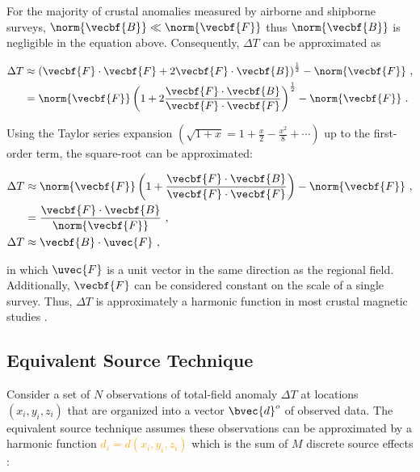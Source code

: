 \noindent
For the majority of crustal anomalies measured by airborne and shipborne surveys, $\norm{\vecbf{B}} \ll \norm{\vecbf{F}}$ thus $\norm{\vecbf{B}}$ is negligible in the equation above. Consequently, $\Delta T$ can be approximated as \citep{Blakley1995}

\begin{align}
    \Delta T &\approx \left(
        \vecbf{F} \cdot \vecbf{F} 
        + 2\vecbf{F} \cdot \vecbf{B}
    \right)^{\frac{1}{2}} 
    - \norm{\vecbf{F}} \ ,
    \\
    &= \norm{\vecbf{F}} \left(
        1 + 2 \dfrac{
            \vecbf{F} \cdot \vecbf{B}
        }{
            \vecbf{F} \cdot \vecbf{F}
        }
    \right)^{\frac{1}{2}} 
    - \norm{\vecbf{F}} \ .
    \label{eq:}
\end{align}

\noindent
Using the Taylor series expansion $\left( \sqrt{1 + x} = 1 + \frac{x}{2} - \frac{x^2}{8} + \cdots \right)$ up to the first-order term, the square-root can be approximated:

\begin{align}
    \Delta T & \approx \norm{\vecbf{F}} \left(
        1 + \dfrac{
            \vecbf{F} \cdot \vecbf{B}
        }{
            \vecbf{F} \cdot \vecbf{F}
        }
    \right) 
    - \norm{\vecbf{F}} \ ,
    \\
    &=
    \dfrac{\vecbf{F} \cdot \vecbf{B}}{\norm{\vecbf{F}}} \ ,
    \\
\label{eq:tfa_dot_product}
    \Delta T & \approx \vecbf{B} \cdot \uvec{F}
    \ ,
\end{align}

\noindent
in which $\uvec{F}$ is a unit vector in the same direction as the regional field. Additionally, $\vecbf{F}$ can be considered constant on the scale of a single survey. Thus, $\Delta T$ is approximately a harmonic function in most crustal magnetic studies \citep{Blakley1995,OliveiraJr2015}.


\subsection{Equivalent Source Technique}

Consider a set of $N$ observations of total-field anomaly $\Delta T$ at locations $(x_i, y_i, z_i)$ that are organized into a vector $\bvec{d}^o$ of observed data. The equivalent source technique assumes these observations can be approximated by a harmonic function \textcolor{orange}{$d_i = d(x_i, y_i, z_i)$} which is the sum of $M$ discrete source effects \citep{Dampney1969, Cordell1992}:

